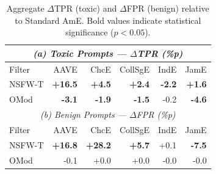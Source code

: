 \begin{table}[t]
\centering
\small
\caption{Aggregate $\Delta$TPR (toxic) and $\Delta$FPR (benign) relative to Standard AmE. Bold values indicate statistical significance ($p < 0.05$).}
\label{tab:aggregate}
\begin{tabular}{lrrrrr}
\toprule
\multicolumn{6}{c}{\textit{(a) Toxic Prompts --- $\Delta$TPR (\%p)}} \\
\midrule
Filter & AAVE & ChcE & CollSgE & IndE & JamE \\
\midrule
NSFW-T & \textbf{+16.5} & \textbf{+4.5} & \textbf{+2.4} & \textbf{-2.2} & \textbf{+1.6} \\
OMod & \textbf{-3.1} & \textbf{-1.9} & \textbf{-1.5} & -0.2 & \textbf{-4.6} \\
\midrule
\multicolumn{6}{c}{\textit{(b) Benign Prompts --- $\Delta$FPR (\%p)}} \\
\midrule
Filter & AAVE & ChcE & CollSgE & IndE & JamE \\
\midrule
NSFW-T & \textbf{+16.8} & \textbf{+28.2} & \textbf{+5.7} & +0.1 & \textbf{-7.5} \\
OMod & -0.1 & +0.0 & +0.0 & -0.0 & -0.0 \\
\bottomrule
\end{tabular}
\end{table}